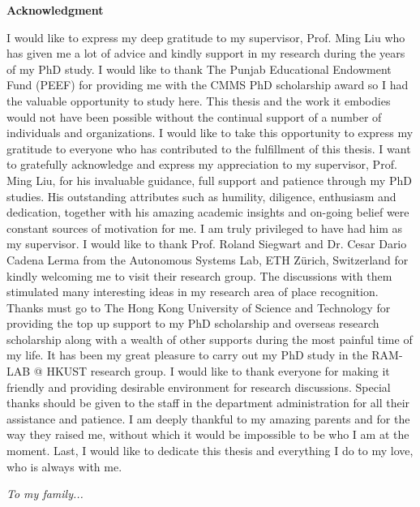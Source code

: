 \newpage

\begin{center}{\Large\bf Acknowledgment}\normalsize
\end{center}
\vspace{0.5cm}

I would like to express my deep gratitude to my supervisor, Prof. Ming Liu who has given me a lot of advice and kindly support in my research during the years of my PhD study. I would like to thank The Punjab Educational Endowment Fund (PEEF) for providing me with the CMMS PhD scholarship award so I had the valuable opportunity to study here. This thesis and the work it embodies would not have been possible without the continual support of a number of individuals and organizations. I would like to take this opportunity to express my gratitude to everyone who has contributed to the fulfillment of this thesis. I want to gratefully acknowledge and express my appreciation to my supervisor, Prof. Ming Liu, for his invaluable guidance, full support and patience through my PhD studies. His outstanding attributes such as humility, diligence, enthusiasm and dedication, together with his amazing academic insights and on-going belief were constant sources of motivation for me. I am truly privileged to have had him as my supervisor. I would like to thank Prof. Roland Siegwart and Dr. Cesar Dario Cadena Lerma from the Autonomous Systems Lab, ETH Zürich, Switzerland for kindly welcoming me to visit their research group. The discussions with them stimulated many interesting ideas in my research area of place recognition. Thanks must go to The Hong Kong University of Science and Technology for providing the top up support to my PhD scholarship and overseas research scholarship along with a wealth of other supports during the most painful time of my life. It has been my great pleasure to carry out my PhD study in the RAM-LAB @ HKUST research group. I would like to thank everyone for making it friendly and providing desirable environment for research discussions. Special thanks should be given to the staff in the department administration for all their assistance and patience. I am deeply thankful to my amazing parents and for the way they raised me, without which it would be impossible to be who I am at the moment. Last, I would like to dedicate this thesis and everything I do to my love, who is always with me.

\newpage
\thispagestyle{empty}
\null\vskip0.5in
\begin{center}


  \vspace{20mm}

  \begin{LARGE}
    \textit{To my family...}
  \end{LARGE}

  \vspace{4mm}



\end{center}

